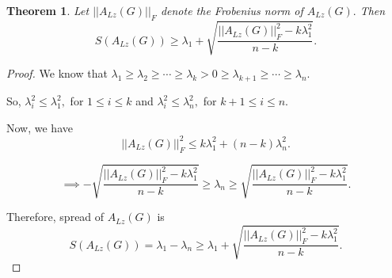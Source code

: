\documentclass[10pt,a4paper,oneside]{article}
\newtheorem{theorem}{Theorem}
\begin{document}
\begin{theorem}
Let $\vert\vert A_{Lz}(G)\vert \vert_F$ denote the Frobenius norm of $A_{Lz}(G).$ Then 
$$S(A_{Lz}(G))\geq \lambda_1+\sqrt{\dfrac{\vert\vert A_{Lz}(G)\vert \vert_F^2-k\lambda_1^2}{n-k}}.$$
\end{theorem}

\begin{proof}
	We know that $\lambda_1\geq \lambda_2\geq \cdots\geq \lambda_k>0\geq \lambda_{k+1}\geq \cdots \geq \lambda_n .$
	
	So, $\lambda_i^2\leq \lambda_1^2,$ for $1\leq i\leq k$ and $\lambda_i^2\leq \lambda_n^2,$ for $k+1\leq i\leq n.$
	
	Now, we have $$\vert\vert A_{Lz}(G)\vert \vert_F^2\leq k\lambda_1^2+(n-k)\lambda_n^2.$$
	
	$$\implies -\sqrt{\dfrac{\vert\vert A_{Lz}(G)\vert \vert_F^2-k\lambda_1^2}{n-k}}\geq \lambda_n\geq \sqrt{\dfrac{\vert\vert A_{Lz}(G)\vert \vert_F^2-k\lambda_1^2}{n-k}}.$$
	
	Therefore, spread of $A_{Lz}(G)$ is 
	$$S(A_{Lz}(G))=\lambda_1-\lambda_n\geq \lambda_1+\sqrt{\dfrac{\vert\vert A_{Lz}(G)\vert \vert_F^2-k\lambda_1^2}{n-k}}.$$
\end{proof}
\end{document}
